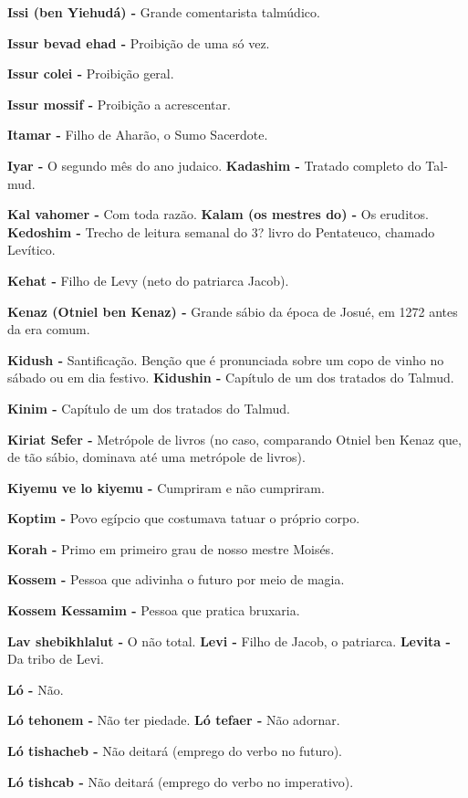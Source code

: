 \textbf{Issi (ben Yiehudá) -} Grande comen­tarista talmúdico.

\textbf{Issur bevad ehad -} Proibição de uma só vez.

\textbf{Issur colei -} Proibição geral.

\textbf{Issur mossif -} Proibição a acrescen­tar.

\textbf{Itamar -} Filho de Aharão, o Sumo Sa­cerdote.

\textbf{Iyar -} O segundo mês do ano judaico. \textbf{Kadashim -}
Tratado completo do Tal­mud.

\textbf{Kal vahomer -} Com toda razão. \textbf{Kalam (os mestres do) -}
Os eruditos. \textbf{Kedoshim -} Trecho de leitura sema­nal do 3? livro
do Pentateuco, chama­do Levítico.

\textbf{Kehat -} Filho de Levy (neto do patriar­ca Jacob).

\textbf{Kenaz (Otniel ben Kenaz) -} Grande sábio da época de Josué, em
1272 an­tes da era comum.

\textbf{Kidush -} Santificação. Benção que é pronunciada sobre um copo
de vinho no sábado ou em dia festivo. \textbf{Kidushin -} Capítulo de um
dos trata­dos do Talmud.

\textbf{Kinim -} Capítulo de um dos tratados do Talmud.

\textbf{Kiriat Sefer -} Metrópole de livros (no caso, comparando Otniel
ben Kenaz que, de tão sábio, dominava até uma metrópole de livros).

\textbf{Kiyemu ve lo kiyemu -} Cumpriram e não cumpriram.

\textbf{Koptim -} Povo egípcio que costuma­va tatuar o próprio corpo.

\textbf{Korah -} Primo em primeiro grau de nosso mestre Moisés.

\textbf{Kossem -} Pessoa que adivinha o futu­ro por meio de magia.

\textbf{Kossem Kessamim -} Pessoa que pra­tica bruxaria.

\textbf{Lav shebikhlalut -} O não total. \textbf{Levi -} Filho de Jacob,
o patriarca. \textbf{Levita -} Da tribo de Levi.

\textbf{Ló -} Não.

\textbf{Ló tehonem -} Não ter piedade. \textbf{Ló tefaer -} Não adornar.

\textbf{Ló tishacheb -} Não deitará (emprego do verbo no futuro).

\textbf{Ló tishcab -} Não deitará (emprego do verbo no imperativo).

